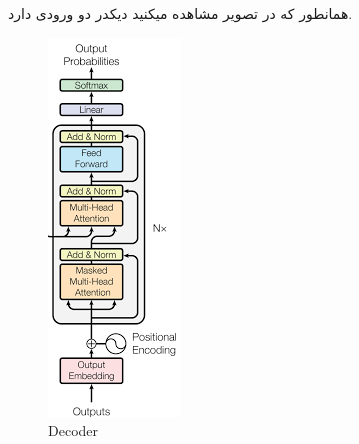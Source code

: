  
 همانطور که در تصویر مشاهده میکنید دیکدر دو ورودی دارد.
 

\begin{figure}[h]
	\centering
	\begin{minipage}[b]{0.25\textwidth}
		\centering
		\includegraphics[width=\textwidth]{transformer_images/decoder.png}
		\caption{Decoder}
		\label{fig:Decoder}
	\end{minipage}
	\hfill
	
\end{figure}

